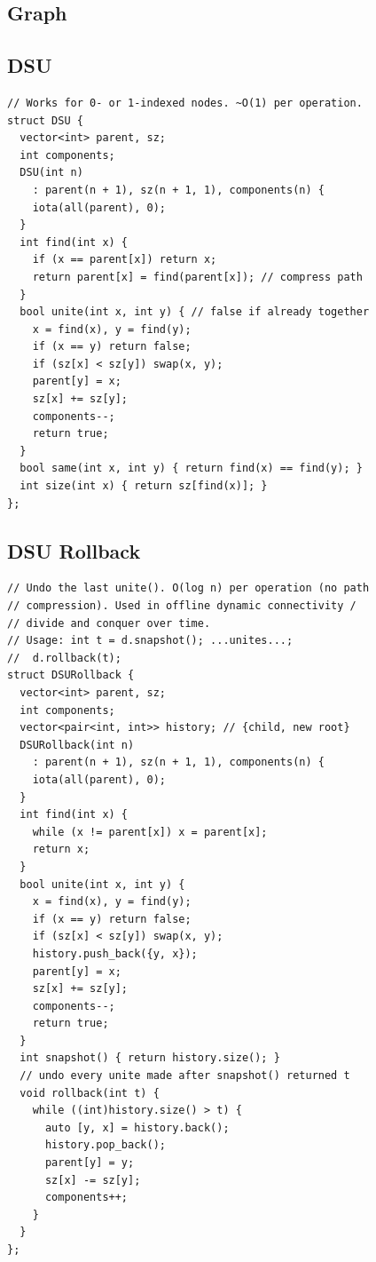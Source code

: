 \documentclass[8pt, a4paper]{article}
\begin{document}
\begin{multicols*}{3}
\section{Graph}
\subsection{DSU}
\begin{lstlisting}
// Works for 0- or 1-indexed nodes. ~O(1) per operation.
struct DSU {
  vector<int> parent, sz;
  int components;
  DSU(int n)
    : parent(n + 1), sz(n + 1, 1), components(n) {
    iota(all(parent), 0);
  }
  int find(int x) {
    if (x == parent[x]) return x;
    return parent[x] = find(parent[x]); // compress path
  }
  bool unite(int x, int y) { // false if already together
    x = find(x), y = find(y);
    if (x == y) return false;
    if (sz[x] < sz[y]) swap(x, y);
    parent[y] = x;
    sz[x] += sz[y];
    components--;
    return true;
  }
  bool same(int x, int y) { return find(x) == find(y); }
  int size(int x) { return sz[find(x)]; }
};
\end{lstlisting}
\subsection{DSU Rollback}
\begin{lstlisting}
// Undo the last unite(). O(log n) per operation (no path
// compression). Used in offline dynamic connectivity /
// divide and conquer over time.
// Usage: int t = d.snapshot(); ...unites...;
//  d.rollback(t);
struct DSURollback {
  vector<int> parent, sz;
  int components;
  vector<pair<int, int>> history; // {child, new root}
  DSURollback(int n)
    : parent(n + 1), sz(n + 1, 1), components(n) {
    iota(all(parent), 0);
  }
  int find(int x) {
    while (x != parent[x]) x = parent[x];
    return x;
  }
  bool unite(int x, int y) {
    x = find(x), y = find(y);
    if (x == y) return false;
    if (sz[x] < sz[y]) swap(x, y);
    history.push_back({y, x});
    parent[y] = x;
    sz[x] += sz[y];
    components--;
    return true;
  }
  int snapshot() { return history.size(); }
  // undo every unite made after snapshot() returned t
  void rollback(int t) {
    while ((int)history.size() > t) {
      auto [y, x] = history.back();
      history.pop_back();
      parent[y] = y;
      sz[x] -= sz[y];
      components++;
    }
  }
};
\end{lstlisting}

\end{multicols*}
\end{document}
